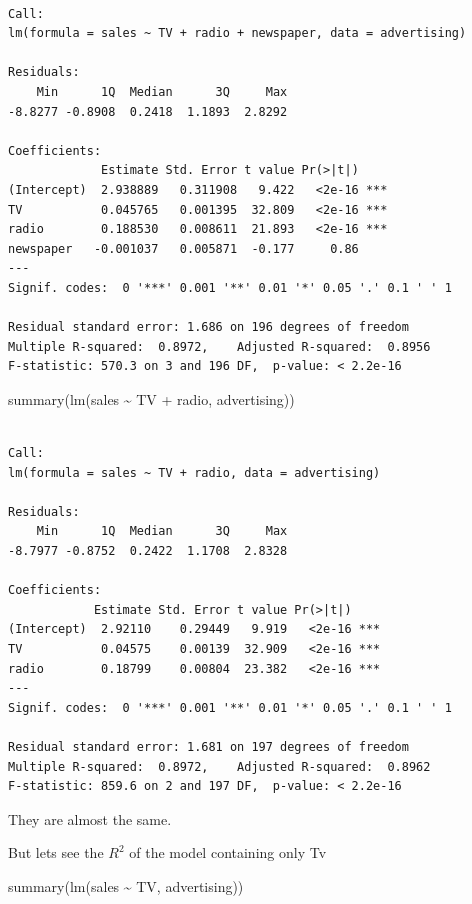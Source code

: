 \documentclass[
  letterpaper,
  DIV=11,
  numbers=noendperiod]{scrreprt}
\newenvironment{Shaded}{\begin{snugshade}}{\end{snugshade}}
\newcommand{\FunctionTok}[1]{\textcolor[rgb]{0.02,0.16,0.49}{#1}}
\newcommand{\NormalTok}[1]{\textcolor[rgb]{0.33,0.33,0.33}{#1}}
\newcommand{\SpecialCharTok}[1]{\textcolor[rgb]{0.00,0.46,0.62}{#1}}
\begin{document}
\begin{verbatim}

Call:
lm(formula = sales ~ TV + radio + newspaper, data = advertising)

Residuals:
    Min      1Q  Median      3Q     Max 
-8.8277 -0.8908  0.2418  1.1893  2.8292 

Coefficients:
             Estimate Std. Error t value Pr(>|t|)    
(Intercept)  2.938889   0.311908   9.422   <2e-16 ***
TV           0.045765   0.001395  32.809   <2e-16 ***
radio        0.188530   0.008611  21.893   <2e-16 ***
newspaper   -0.001037   0.005871  -0.177     0.86    
---
Signif. codes:  0 '***' 0.001 '**' 0.01 '*' 0.05 '.' 0.1 ' ' 1

Residual standard error: 1.686 on 196 degrees of freedom
Multiple R-squared:  0.8972,    Adjusted R-squared:  0.8956 
F-statistic: 570.3 on 3 and 196 DF,  p-value: < 2.2e-16
\end{verbatim}

\begin{Shaded}
\begin{Highlighting}[]
\FunctionTok{summary}\NormalTok{(}\FunctionTok{lm}\NormalTok{(sales }\SpecialCharTok{\textasciitilde{}}\NormalTok{ TV }\SpecialCharTok{+}\NormalTok{ radio, advertising))}
\end{Highlighting}
\end{Shaded}

\begin{verbatim}

Call:
lm(formula = sales ~ TV + radio, data = advertising)

Residuals:
    Min      1Q  Median      3Q     Max 
-8.7977 -0.8752  0.2422  1.1708  2.8328 

Coefficients:
            Estimate Std. Error t value Pr(>|t|)    
(Intercept)  2.92110    0.29449   9.919   <2e-16 ***
TV           0.04575    0.00139  32.909   <2e-16 ***
radio        0.18799    0.00804  23.382   <2e-16 ***
---
Signif. codes:  0 '***' 0.001 '**' 0.01 '*' 0.05 '.' 0.1 ' ' 1

Residual standard error: 1.681 on 197 degrees of freedom
Multiple R-squared:  0.8972,    Adjusted R-squared:  0.8962 
F-statistic: 859.6 on 2 and 197 DF,  p-value: < 2.2e-16
\end{verbatim}

They are almost the same.

But lets see the \(R^2\) of the model containing only Tv

\begin{Shaded}
\begin{Highlighting}[]
\FunctionTok{summary}\NormalTok{(}\FunctionTok{lm}\NormalTok{(sales }\SpecialCharTok{\textasciitilde{}}\NormalTok{ TV, advertising))}
\end{Highlighting}
\end{Shaded}
\end{document}
